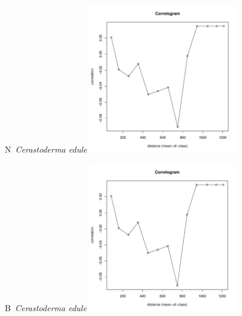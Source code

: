 \documentclass[12pt, a4paper]{disser}
\begin{document}
\begin{figure}[h]
	
	\begin{minipage}[b]{.46\linewidth}
	\begin{center}
	{\small N~{\it Cerastoderma edule}}
		\includegraphics[width=65mm]{../Barenc_Sea/distribution_Moran/Yarnyshnaya07_moran_B_Cerastoderma_edule_.pdf}

	\end{center}
	\end{minipage}
	\hfil %
	\begin{minipage}[b]{.46\linewidth}
	\begin{center}
	{\small B~{\it Cerastoderma edule}}
		\includegraphics[width=65mm]{../Barenc_Sea/distribution_Moran/Yarnyshnaya07_moran_B_Cerastoderma_edule_.pdf}
	\end{center}
	\end{minipage}






\end{figure}
\end{document}
